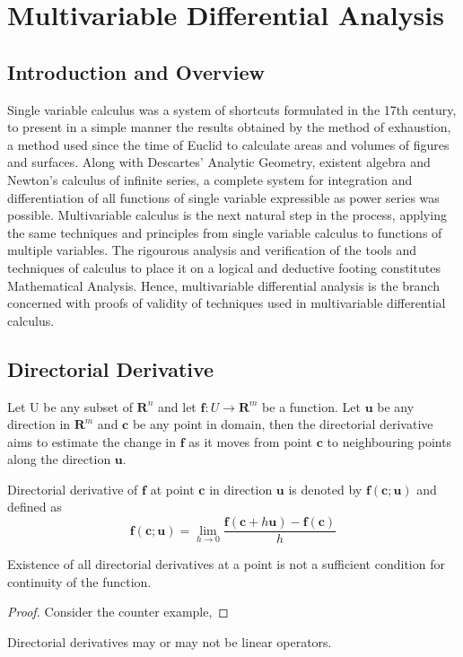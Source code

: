 
\chapter{Multivariable Differential Analysis} %

\label{Chapter1} %


\section{Introduction and Overview}
Single variable calculus was a system of shortcuts formulated in the 17th century,
to present in a simple manner the results obtained by the method of exhaustion, a
method used since the time of Euclid to calculate areas and volumes of figures
and surfaces. Along with Descartes' Analytic Geometry, existent algebra and
Newton's calculus of infinite series, a complete system for integration and
differentiation of all functions of single variable expressible as power series
was possible.
\newline
Multivariable calculus is the next natural step in the process, applying the
same techniques and principles from single variable calculus to functions of
multiple variables.
\newline
The rigourous analysis and verification of the tools and techniques of calculus
to place it on a logical and deductive footing constitutes Mathematical Analysis. Hence,
multivariable differential analysis is the branch concerned with proofs of
validity of techniques used in multivariable differential calculus.


\section{Directorial Derivative}
Let U be any subset of $\bm{R}^n$ and let $\bm{f} : U \rightarrow \bm{R}^m$  be a function.
Let $\bm{u}$ be any direction in $\bm{R}^m$ and $\bm{c}$ be any point in domain,
then the directorial derivative aims to estimate the change in $\bm{f}$ as it
moves from point $\bm{c}$ to neighbouring points along the direction $\bm{u}$.
\begin{definition}
Directorial derivative of $\bm{f}$ at point $\bm{c}$ in direction $\bm{u}$ is
denoted by $\bm{f(c;u)}$ and defined as 
\[ \bm{f(c;u)} = \lim_{h \to 0}
\frac{\bm{f}(\bm{c}+h\bm{u})-\bm{f(c)}}{h} \]
\end{definition}
\begin{lemma}
Existence of all directorial derivatives at a point is not a sufficient
condition for continuity of the function.
\end{lemma}
\begin{proof}
Consider the counter example,
\end{proof}
\begin{corollary}
Directorial derivatives may or may not be linear operators.
\end{corollary}


